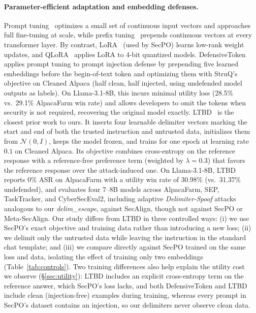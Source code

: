 \documentclass{article}
\begin{document}
\paragraph{Parameter-efficient adaptation and embedding defenses.} Prompt tuning~\cite{lester2021prompt} optimizes a small set of continuous input vectors and approaches full fine-tuning at scale, while prefix tuning~\cite{li2021prefix} prepends continuous vectors at every transformer layer. By contrast, LoRA~\cite{hu2022lora} (used by SecPO) learns low-rank weight updates, and QLoRA~\cite{dettmers2023qlora} applies LoRA to 4-bit quantized models. DefensiveToken~\cite{chen2025defensivetoken} applies prompt tuning to prompt injection defense by prepending five learned embeddings before the begin-of-text token and optimizing them with StruQ's objective on Cleaned Alpaca (half clean, half injected, using undefended model outputs as labels). On Llama-3.1-8B, this incurs minimal utility loss (28.5\% vs.\ 29.1\% AlpacaFarm win rate) and allows developers to omit the tokens when security is not required, recovering the original model exactly. LTBD~\cite{zhao2026ltbd} is the closest prior work to ours. It inserts four learnable delimiter vectors marking the start and end of both the trusted instruction and untrusted data, initializes them from $\mathcal{N}(0, I)$, keeps the model frozen, and trains for one epoch at learning rate $0.1$ on Cleaned Alpaca. Its objective combines cross-entropy on the reference response with a reference-free preference term (weighted by $\lambda = 0.3$) that favors the reference response over the attack-induced one. On Llama-3.1-8B, LTBD reports 0\% ASR on AlpacaFarm with a utility win rate of 30.98\% (vs.\ 31.37\% undefended), and evaluates four 7--8B models across AlpacaFarm, SEP, TaskTracker, and CyberSecEval2, including adaptive \emph{Delimiter-Spoof} attacks analogous to our \emph{delim\_escape}, against SecAlign, though not against SecPO or Meta-SecAlign. Our study differs from LTBD in three controlled ways: (i) we use SecPO's exact objective and training data rather than introducing a new loss; (ii) we delimit only the untrusted data while leaving the instruction in the standard chat template; and (iii) we compare directly against SecPO trained on the same loss and data, isolating the effect of training only two embeddings (Table~\ref{tab:controls}). Two training differences also help explain the utility cost we observe (\S\ref{sec:utility}): LTBD includes an explicit cross-entropy term on the reference answer, which SecPO's loss lacks, and both DefensiveToken and LTBD include clean (injection-free) examples during training, whereas every prompt in SecPO's dataset contains an injection, so our delimiters never observe clean data.
\end{document}
